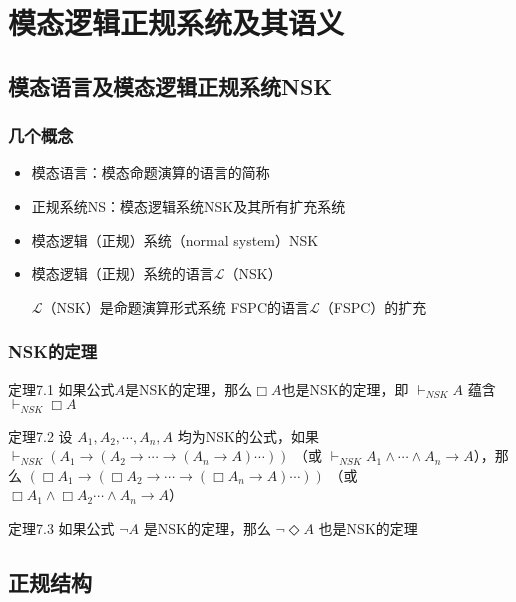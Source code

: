 \documentclass[CJK]{beamer}
\begin{document}
\section{模态逻辑正规系统及其语义}

\subsection{模态语言及模态逻辑正规系统NSK}

\begin{frame}
 \frametitle{几个概念}
 \begin{itemize}
 \item 模态语言：模态命题演算的语言的简称
 \item \alert{正规系统NS：模态逻辑系统NSK及其所有扩充系统}
 \item 模态逻辑（正规）系统（normal system）NSK
 \item 模态逻辑（正规）系统的语言$\mathcal{L}$（NSK）

$\mathcal{L}$（NSK）是命题演算形式系统  FSPC的语言$\mathcal{L}$（FSPC）的扩充
 \end{itemize}
\end{frame}

\begin{frame}
 \frametitle{NSK的定理}
 \begin{block}{定理7.1}
   如果公式$A$是NSK的定理，那么$\Box A$也是NSK的定理，即 $\vdash_{NSK} A$ 蕴含 $\vdash_{NSK} \Box A$
 \end{block}
 \begin{block}{定理7.2}
   设 $A_1,A_2,\cdots,A_n,A$ 均为NSK的公式，如果  $\vdash_{NSK}(A_1 \to (A_2 \to \cdots \to (A_n \to A)\cdots))$ （或 $\vdash_{NSK} A_1 \wedge \cdots \wedge A_n \to A$），那么 $(\Box A_1 \to (\Box A_2 \to \cdots \to (\Box A_n \to A)\cdots))$ （或 $\Box A_1 \wedge \Box A_2 \cdots \wedge A_n \to A$）
 \end{block}
 \begin{block}{定理7.3}
   如果公式 $\neg A$ 是NSK的定理，那么 $\neg \Diamond A$ 也是NSK的定理
 \end{block}
\end{frame}


\subsection{正规结构}
\end{document}
